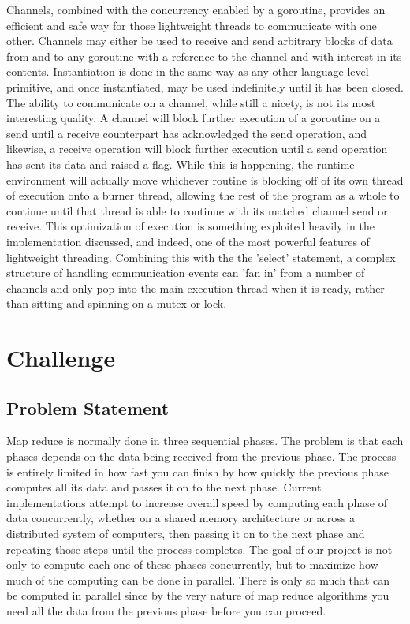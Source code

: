 \documentclass[report]{IEEEtran}
\begin{document}
Channels, combined with the concurrency enabled by a goroutine, provides an efficient and safe way for those lightweight threads to communicate with one other. Channels may either be used to receive and send arbitrary blocks of data from and to any goroutine with a reference to the channel and with interest in its contents. Instantiation is done in the same way as any other language level primitive, and once instantiated, may be used indefinitely until it has been closed. The ability to communicate on a channel, while still a nicety, is not its most interesting quality. A channel will block further execution of a goroutine on a send until a receive counterpart has acknowledged the send operation, and likewise, a receive operation will block further execution until a send operation has sent its data and raised a flag. While this is happening, the runtime environment will actually move whichever routine is blocking off of its own thread of execution onto a burner thread, allowing the rest of the program as a whole to continue until that thread is able to continue with its matched channel send or receive. This optimization of execution is something exploited heavily in the implementation discussed, and indeed, one of the most powerful features of lightweight threading. Combining this with the the 'select' statement, a complex structure of handling communication events can 'fan in' from a number of channels and only pop into the main execution thread when it is ready, rather than sitting and spinning on a mutex or lock.

\section{Challenge}
\subsection{Problem Statement}
Map reduce is normally done in three sequential phases. The problem is that each phases depends on the data being received from the previous phase. The process is entirely limited in how fast you can finish by how quickly the previous phase computes all its data and passes it on to the next phase. Current implementations attempt to increase overall speed by computing each phase of data concurrently, whether on a shared memory architecture or across a distributed system of computers, then passing it on to the next phase and repeating those steps until the process completes. The goal of our project is not only to compute each one of these phases concurrently, but to maximize how much of the computing can be done in parallel. There is only so much that can be computed in parallel since by the very nature of map reduce algorithms you need all the data from the previous phase before you can proceed. 
\end{document}
